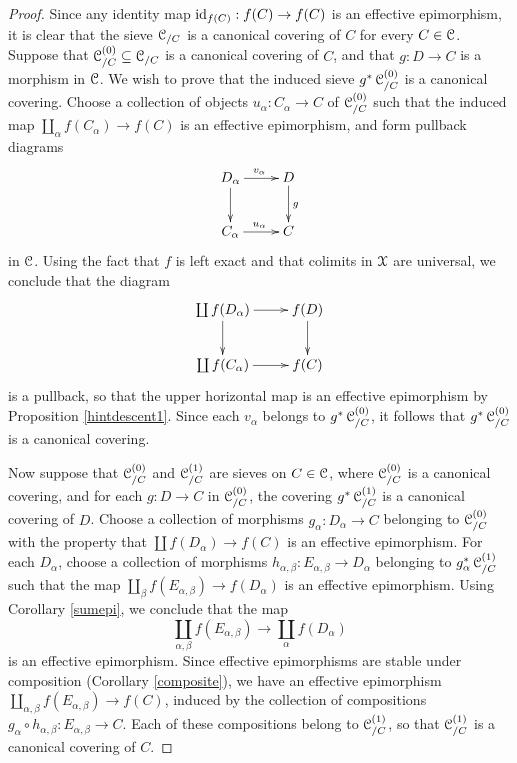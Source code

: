 \begin{proof}
Since any identity map $\operatorname{id}_{f(C)}: f(C) \rightarrow f(C)$ is an effective epimorphism, it is clear that
the sieve $\operatorname{\mathcal{C}}_{/C}$ is a canonical covering of $C$ for every $C \in \operatorname{\mathcal{C}}$. Suppose
that $\operatorname{\mathcal{C}}_{/C}^{(0)} \subseteq \operatorname{\mathcal{C}}_{/C}$ is a canonical covering of $C$, and that
$g: D \rightarrow C$ is a morphism in $\operatorname{\mathcal{C}}$. We wish to prove that
the induced sieve $g^{\ast} \operatorname{\mathcal{C}}_{/C}^{(0)}$ is a canonical covering. Choose a 
collection of objects $u_{\alpha}: C_{\alpha} \rightarrow C$ of $\operatorname{\mathcal{C}}_{/C}^{(0)}$ 
such that the induced map $\coprod_{\alpha} f(C_{\alpha}) \rightarrow f(C)$ is an
effective epimorphism, and form pullback diagrams
$$ \xymatrix{ D_{\alpha} \ar[r]^{v_{\alpha}} \ar[d] & D \ar[d]^{g} \\
C_{\alpha} \ar[r]^{u_{\alpha}} & C }$$
in $\operatorname{\mathcal{C}}$. Using the fact that $f$ is left exact and that colimits in $\operatorname{\mathcal{X}}$ are universal, we conclude that the diagram
$$ \xymatrix{ \coprod f(D_{\alpha}) \ar[r] \ar[d] & f(D) \ar[d] \\
\coprod f(C_{\alpha}) \ar[r] & f(C) }$$
is a pullback, so that the upper  horizontal map is an effective epimorphism by Proposition \ref{hintdescent1}. Since each $v_{\alpha}$ belongs to $g^{\ast} \operatorname{\mathcal{C}}_{/C}^{(0)}$, it follows that
$g^{\ast} \operatorname{\mathcal{C}}_{/C}^{(0)}$ is a canonical covering.

Now suppose that $\operatorname{\mathcal{C}}_{/C}^{(0)}$ and $\operatorname{\mathcal{C}}_{/C}^{(1)}$ are sieves on $C \in \operatorname{\mathcal{C}}$, where
$\operatorname{\mathcal{C}}_{/C}^{(0)}$ is a canonical covering, and for each $g: D \rightarrow C$ in $\operatorname{\mathcal{C}}_{/C}^{(0)}$, the covering $g^{\ast} \operatorname{\mathcal{C}}_{/C}^{(1)}$ is a canonical covering of $D$. Choose a collection
of morphisms $g_{\alpha}: D_{\alpha} \rightarrow C$ belonging to $\operatorname{\mathcal{C}}_{/C}^{(0)}$ with the property that $\coprod f(D_{\alpha}) \rightarrow f(C)$ is an effective epimorphism. For each
$D_{\alpha}$, choose a collection of morphisms $h_{\alpha,\beta}: E_{\alpha,\beta} \rightarrow D_{\alpha}$ belonging to $g_{\alpha}^{\ast} \operatorname{\mathcal{C}}_{/C}^{(1)}$ such that the map
$\coprod_{\beta} f(E_{\alpha,\beta}) \rightarrow f(D_{\alpha})$ is an effective epimorphism.
Using Corollary \ref{sumepi}, we conclude that the map
$$ \coprod_{\alpha,\beta} f(E_{\alpha,\beta}) \rightarrow \coprod_{\alpha} f(D_{\alpha})$$ is an effective epimorphism. Since effective epimorphisms are stable under composition (Corollary \ref{composite}), we have an effective epimorphism $\coprod_{\alpha,\beta} f(E_{\alpha,\beta}) \rightarrow f(C)$, induced by the collection of compositions $g_{\alpha} \circ h_{\alpha,\beta}: E_{\alpha,\beta} \rightarrow C$. Each of these compositions belong to $\operatorname{\mathcal{C}}_{/C}^{(1)}$, so
that $\operatorname{\mathcal{C}}_{/C}^{(1)}$ is a canonical covering of $C$.
\end{proof}

